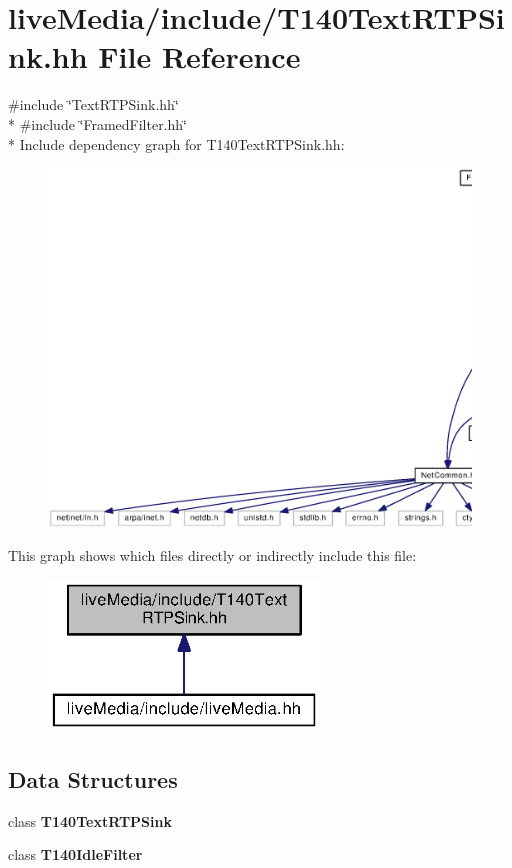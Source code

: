 \section{live\+Media/include/\+T140\+Text\+R\+T\+P\+Sink.hh File Reference}
\label{T140TextRTPSink_8hh}
{\ttfamily \#include \char`\"{}Text\+R\+T\+P\+Sink.\+hh\char`\"{}}\\*
{\ttfamily \#include \char`\"{}Framed\+Filter.\+hh\char`\"{}}\\*
Include dependency graph for T140\+Text\+R\+T\+P\+Sink.\+hh\+:
\nopagebreak
\begin{figure}[H]
\begin{center}
\leavevmode
\includegraphics[width=350pt]{T140TextRTPSink_8hh__incl}
\end{center}
\end{figure}
This graph shows which files directly or indirectly include this file\+:
\nopagebreak
\begin{figure}[H]
\begin{center}
\leavevmode
\includegraphics[width=204pt]{T140TextRTPSink_8hh__dep__incl}
\end{center}
\end{figure}
\subsection*{Data Structures}
\begin{DoxyCompactItemize}
\item 
class {\bf T140\+Text\+R\+T\+P\+Sink}
\item 
class {\bf T140\+Idle\+Filter}
\end{DoxyCompactItemize}
